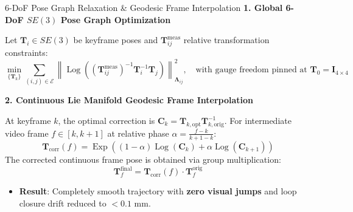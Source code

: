 \documentclass[aspectratio=169, 10pt]{beamer}
\begin{document}
\begin{frame}{6-DoF Pose Graph Relaxation \& Geodesic Frame Interpolation}
  {\normalsize \textbf{\textcolor{NavyBlue}{1. Global 6-DoF $SE(3)$ Pose Graph Optimization}}}
  \vspace{0.1cm}

  Let $\mathbf{T}_i \in SE(3)$ be keyframe poses and $\mathbf{T}_{ij}^{\text{meas}}$ relative transformation constraints:
  \begin{equation}
    \min_{\{\mathbf{T}_k\}} \sum_{(i,j) \in \mathcal{E}} \left\| \operatorname{Log}\left( (\mathbf{T}_{ij}^{\text{meas}})^{-1} \mathbf{T}_i^{-1} \mathbf{T}_j \right) \right\|_{\mathbf{\Lambda}_{ij}}^2, \quad \text{with gauge freedom pinned at } \mathbf{T}_0 = \mathbf{I}_{4 \times 4}
  \end{equation}

  \vspace{0.25cm}
  {\normalsize \textbf{\textcolor{NavyBlue}{2. Continuous Lie Manifold Geodesic Frame Interpolation}}}
  \vspace{0.1cm}

  At keyframe $k$, the optimal correction is $\mathbf{C}_k = \mathbf{T}_{k,\text{opt}} \mathbf{T}_{k,\text{orig}}^{-1}$. For intermediate video frame $f \in [k, k+1]$ at relative phase $\alpha = \frac{f - k}{k+1 - k}$:
  \begin{equation}
    \mathbf{T}_{\text{corr}}(f) = \operatorname{Exp}\left( (1 - \alpha) \operatorname{Log}(\mathbf{C}_k) + \alpha \operatorname{Log}(\mathbf{C}_{k+1}) \right)
  \end{equation}
  The corrected continuous frame pose is obtained via group multiplication:
  \begin{equation}
    \mathbf{T}_f^{\text{final}} = \mathbf{T}_{\text{corr}}(f) \cdot \mathbf{T}_f^{\text{orig}}
  \end{equation}
  \begin{itemize}
    \setlength{\itemsep}{2pt}
    \item \textbf{Result}: Completely smooth trajectory with \textbf{zero visual jumps} and loop closure drift reduced to \textbf{$< 0.1\text{ mm}$}.
  \end{itemize}
\end{frame}
\end{document}
